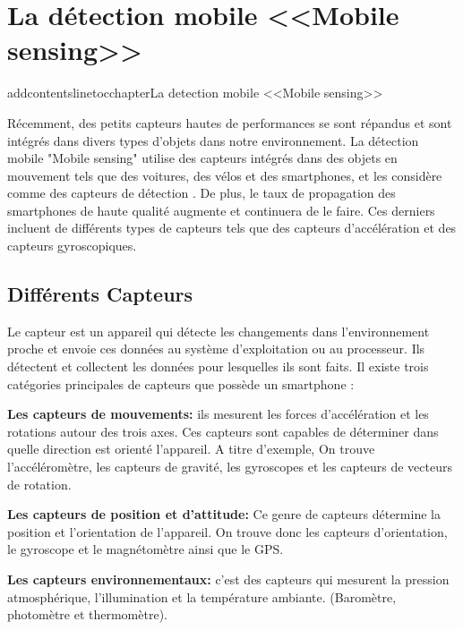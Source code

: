 \renewcommand\labelitemi{-}
\renewcommand\labelitemii{$\circ$}
\renewcommand {\thesection}{\arabic{section}}
\chapter{La détection mobile <<Mobile sensing>>}
addcontentsline{toc}{chapter}{La detection mobile <<Mobile sensing>>}

Récemment, des petits capteurs hautes de performances se sont répandus et sont intégrés dans divers types d'objets dans notre environnement.\newline
La détection mobile "Mobile sensing" utilise des capteurs intégrés dans des objets en mouvement tels que des voitures, des vélos et des smartphones, et les considère comme des capteurs de détection \cite{nomuraMethodEstimatingRoad2015}.\newline
De plus, le taux de propagation des smartphones de haute qualité augmente et continuera de le faire. Ces derniers incluent de différents types de capteurs tels que des capteurs d'accélération et des capteurs gyroscopiques.



\section{Différents Capteurs} 

Le capteur est un appareil qui détecte les changements dans l'environnement proche et envoie ces données au système d'exploitation ou au processeur. Ils détectent et collectent les données pour lesquelles ils sont faits.\newline
Il existe trois catégories principales de capteurs que possède un smartphone \cite{tilluMobileSensorsComponents2019}:

{\bf Les capteurs de mouvements:}
 ils mesurent les forces d'accélération et les rotations autour des trois axes.  Ces capteurs sont capables de déterminer dans quelle direction est orienté l’appareil. A titre d’exemple, On trouve l'accéléromètre, les capteurs de gravité, les gyroscopes et les capteurs de vecteurs de rotation.

 {\bf Les capteurs de position et d’attitude:}
  Ce genre de capteurs détermine la position et l’orientation de l'appareil. On trouve donc les capteurs d’orientation, le gyroscope et le magnétomètre ainsi que le GPS. 
 
 {\bf Les capteurs environnementaux:}
 c’est des capteurs qui mesurent la pression atmosphérique, l'illumination et la température ambiante. (Baromètre, photomètre et thermomètre).

